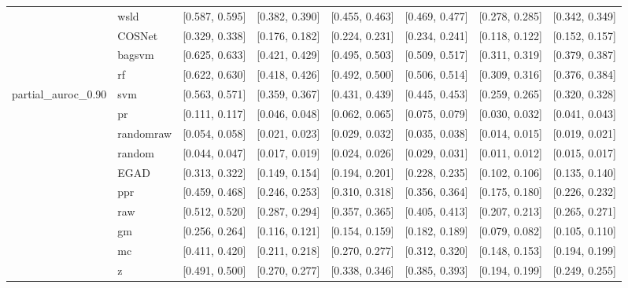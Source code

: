 \begin{table}[H]
{\begin{tabular}{llllllll}
 & wsld & [0.587, 0.595] & [0.382, 0.390] & [0.455, 0.463] & [0.469, 0.477] & [0.278, 0.285] & [0.342, 0.349]\\

 & COSNet & [0.329, 0.338] & [0.176, 0.182] & [0.224, 0.231] & [0.234, 0.241] & [0.118, 0.122] & [0.152, 0.157]\\

 & bagsvm & [0.625, 0.633] & [0.421, 0.429] & [0.495, 0.503] & [0.509, 0.517] & [0.311, 0.319] & [0.379, 0.387]\\

 & rf & [0.622, 0.630] & [0.418, 0.426] & [0.492, 0.500] & [0.506, 0.514] & [0.309, 0.316] & [0.376, 0.384]\\

\multirow{-15}{*}{\raggedright\arraybackslash partial\_auroc\_0.90} & svm & [0.563, 0.571] & [0.359, 0.367] & [0.431, 0.439] & [0.445, 0.453] & [0.259, 0.265] & [0.320, 0.328]\\
\cmidrule{1-8}
 & pr & [0.111, 0.117] & [0.046, 0.048] & [0.062, 0.065] & [0.075, 0.079] & [0.030, 0.032] & [0.041, 0.043]\\

 & randomraw & [0.054, 0.058] & [0.021, 0.023] & [0.029, 0.032] & [0.035, 0.038] & [0.014, 0.015] & [0.019, 0.021]\\

 & random & [0.044, 0.047] & [0.017, 0.019] & [0.024, 0.026] & [0.029, 0.031] & [0.011, 0.012] & [0.015, 0.017]\\

 & EGAD & [0.313, 0.322] & [0.149, 0.154] & [0.194, 0.201] & [0.228, 0.235] & [0.102, 0.106] & [0.135, 0.140]\\

 & ppr & [0.459, 0.468] & [0.246, 0.253] & [0.310, 0.318] & [0.356, 0.364] & [0.175, 0.180] & [0.226, 0.232]\\

 & raw & [0.512, 0.520] & [0.287, 0.294] & [0.357, 0.365] & [0.405, 0.413] & [0.207, 0.213] & [0.265, 0.271]\\

 & gm & [0.256, 0.264] & [0.116, 0.121] & [0.154, 0.159] & [0.182, 0.189] & [0.079, 0.082] & [0.105, 0.110]\\

 & mc & [0.411, 0.420] & [0.211, 0.218] & [0.270, 0.277] & [0.312, 0.320] & [0.148, 0.153] & [0.194, 0.199]\\

 & z & [0.491, 0.500] & [0.270, 0.277] & [0.338, 0.346] & [0.385, 0.393] & [0.194, 0.199] & [0.249, 0.255]\\


\end{tabular}}
\end{table}
